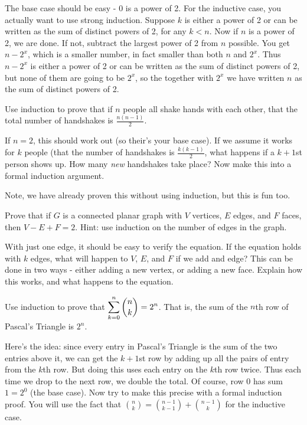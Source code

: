 \begin{questions}
	\begin{answer}
		The base case should be easy - 0 is a power of 2.  For the inductive case, you actually want to use strong induction.  Suppose $k$ is either a power of 2 or can be written as the sum of distinct powers of 2, for any $k < n$.  Now if $n$ is a power of 2, we are done.  If not, subtract the largest power of 2 from $n$ possible.  You get $n - 2^x$, which is a smaller number, in fact smaller than both $n$ and $2^x$.  Thus $n-2^x$ is either a power of 2 or can be written as the sum of distinct powers of 2, but none of them are going to be $2^x$, so the together with $2^x$ we have written $n$ as the sum of distinct powers of 2.
	\end{answer}	

\question  Use induction to prove that if $n$ people all shake hands with each other, that the total number of handshakes is $\frac{n(n-1)}{2}$. 

	\begin{answer}
	  If $n = 2$, this should work out (so their's your base case).  If we assume it works for $k$ people (that the number of handshakes is $\frac{k(k-1)}{2}$, what happens if a $k+1$st person shows up.  How many {\em new} handshakes take place?  Now make this into a formal induction argument.
	  
	  Note, we have already proven this without using induction, but this is fun too.
	\end{answer}

\question Prove that if $G$ is a connected planar graph with $V$ vertices, $E$ edges, and $F$ faces, then $V - E + F = 2$.  Hint: use induction on the number of edges in the graph.

	\begin{answer}
		With just one edge, it should be easy to verify the equation.  If the equation holds with $k$ edges, what will happen to $V$, $E$, and $F$ if we add and edge?  This can be done in two ways - either adding a new vertex, or adding a new face.  Explain how this works, and what happens to the equation.
	\end{answer} 
	
\question Use induction to prove that $\displaystyle\sum_{k=0}^n {n \choose k} = 2^n$.  That is, the sum of the $n$th row of Pascal's Triangle is $2^n$.

	\begin{answer}
		Here's the idea: since every entry in Pascal's Triangle is the sum of the two entries above it, we can get the $k+1$st row by adding up all the pairs of entry from the $k$th row.  But doing this uses each entry on the $k$th row twice.  Thus each time we drop to the next row, we double the total.  Of course, row 0 has sum $1 = 2^0$ (the base case).  Now try to make this precise with a formal induction proof.  You will use the fact that ${n \choose k} = {n-1 \choose k-1} + {n-1 \choose k}$ for the inductive case.
	\end{answer}
	

\end{questions}

